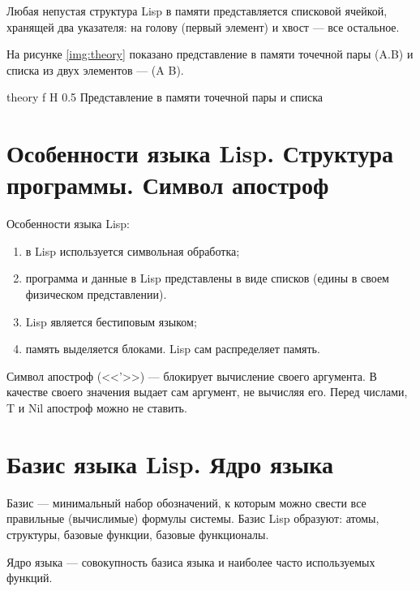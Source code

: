 Любая непустая структура Lisp в памяти представляется списковой ячейкой, хранящей два указателя: на голову (первый элемент) и хвост --- все остальное.

На рисунке \ref{img:theory} показано представление в памяти точечной пары (A.B) и списка из двух элементов --- (A B).

{theory} %
{f} %
{H} %
{0.5\textwidth} %
{Представление в памяти точечной пары и списка} %

\section{Особенности языка Lisp. Структура программы. Символ апостроф}

Особенности языка Lisp:
\begin{enumerate}
	\item в Lisp используется символьная обработка;
	\item программа и данные в Lisp представлены в виде списков (едины в своем физическом представлении).
	\item Lisp является бестиповым языком;
	\item память выделяется блоками. Lisp сам распределяет память.
\end{enumerate}

Символ апостроф (<<'>>) --- блокирует вычисление своего аргумента. В качестве своего значения выдает сам аргумент, не вычисляя его. Перед числами, T и Nil апостроф можно не ставить.

\section{Базис языка Lisp. Ядро языка}

Базис --- минимальный набор обозначений, к которым можно свести все правильные (вычислимые) формулы системы.
Базис Lisp образуют: атомы, структуры, базовые функции, базовые функционалы.

Ядро языка --- совокупность базиса языка и наиболее часто используемых функций.